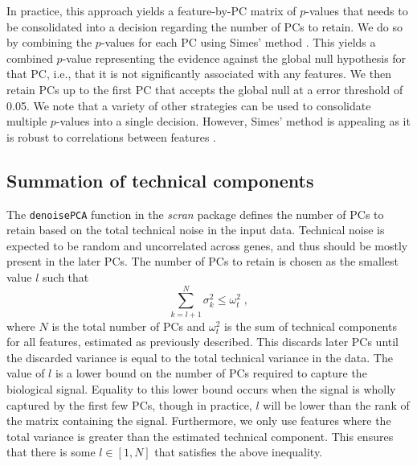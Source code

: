 \documentclass[10pt,letterpaper]{article}
\newcommand\code[1]{{\small\texttt{#1}}}
\begin{document}
In practice, this approach yields a feature-by-PC matrix of $p$-values that needs to be consolidated into a decision regarding the number of PCs to retain. 
We do so by combining the $p$-values for each PC using Simes' method \cite{simes1986improved}.
This yields a combined $p$-value representing the evidence against the global null hypothesis for that PC, 
i.e., that it is not significantly associated with any features.
We then retain PCs up to the first PC that accepts the global null at a error threshold of 0.05.
We note that a variety of other strategies can be used to consolidate multiple $p$-values into a single decision.
However, Simes' method is appealing as it is robust to correlations between features \cite{sarkar1997simes}.

\subsection{Summation of technical components}
The \code{denoisePCA} function in the \textit{scran} package \cite{lun2016stepbystep} defines the number of PCs to retain based on the total technical noise in the input data.
Technical noise is expected to be random and uncorrelated across genes, and thus should be mostly present in the later PCs.
The number of PCs to retain is chosen as the smallest value $l$ such that 
\[
    \sum_{k=l+1}^N \sigma^2_k  \le \omega^2_t \;,
\]
where $N$ is the total number of PCs and $\omega^2_t$ is the sum of technical components for all features, estimated as previously described.
This discards later PCs until the discarded variance is equal to the total technical variance in the data.
The value of $l$ is a lower bound on the number of PCs required to capture the biological signal.
Equality to this lower bound occurs when the signal is wholly captured by the first few PCs,
though in practice, $l$ will be lower than the rank of the matrix containing the signal.
Furthermore, we only use features where the total variance is greater than the estimated technical component.
This ensures that there is some $l \in [1, N]$ that satisfies the above inequality.
\end{document}
